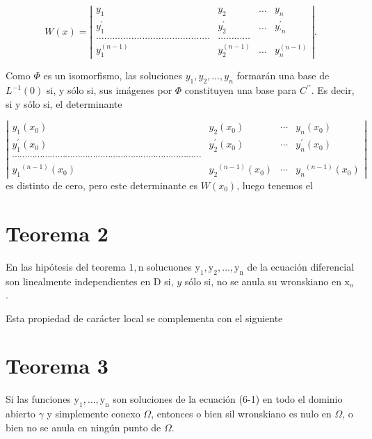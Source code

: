 \documentclass[10pt]{article}
\theoremstyle{plain}
\theoremstyle{definition}
\theoremstyle{remark}
\begin{document}
$$
W(x)=\left|\begin{array}{cccc}
y_{1} & y_{2} & \ldots & y_{n} \\
y_{1}^{\prime} & y_{2}^{\prime} & \ldots & y_{\prime n}^{\prime} \\
\ldots \ldots \ldots \ldots \ldots \ldots \ldots \ldots \ldots \ldots \ldots \ldots \ldots \ldots & \ldots \ldots \ldots \ldots \\
y_{1}^{(n-1)} & y_{2}^{(n-1)} & \ldots & y_{n}^{(n-1)}
\end{array}\right| .
$$

Como $\Phi$ es un isomorfismo, las soluciones $y_{1}, y_{2}, \ldots, y_{n}$ formarán una base de $L^{-1}(0)$ si, y sólo si, sus imágenes por $\Phi$ constituyen una base para $C^{\prime \prime}$. Es decir, si y sólo si, el determinante

$\left|\begin{array}{cccc}y_{1}\left(x_{0}\right) & y_{2}\left(x_{0}\right) & \cdots & y_{n}\left(x_{0}\right) \\ y_{1}^{\prime}\left(x_{0}\right) & y_{2}^{\prime}\left(x_{0}\right) & \cdots & y_{n}^{\prime}\left(x_{0}\right) \\ \cdots \cdots \cdots \cdots \cdots \cdots \cdots \cdots \cdots \cdots \cdots \cdots \cdots \cdots \cdots \cdots \cdots \cdots \cdots \cdots \cdots \cdots \cdots \cdots \cdots & \\ y_{1}{ }^{(n-1)}\left(x_{0}\right) & y_{2}{ }^{(n-1)}\left(x_{0}\right) & \cdots & y_{n}{ }^{(n-1)}\left(x_{0}\right)\end{array}\right|$\\
es distinto de cero, pero este determinante es $W\left(x_{0}\right)$, luego tenemos el

\section*{Teorema 2}
En las hipótesis del teorema $1, \mathrm{n}$ solucuones $\mathrm{y}_{1}, \mathrm{y}_{2}, \ldots, \mathrm{y}_{\mathrm{n}}$ de la ecuación diferencial son linealmente independientes en D si, $y$ sólo si, no se anula su wronskiano en $\mathrm{x}_{\mathrm{o}}$.

Esta propiedad de carácter local se complementa con el siguiente

\section*{Teorema 3}
Si las funciones $\mathrm{y}_{1}, \ldots, \mathrm{y}_{\mathrm{n}}$ son soluciones de la ecuación (6-1) en todo el dominio abierto $\gamma$ y simplemente conexo $\Omega$, entonces o bien sil wronskiano es nulo en $\Omega$, o bien no se anula en ningún punto de $\Omega$.
\end{document}

